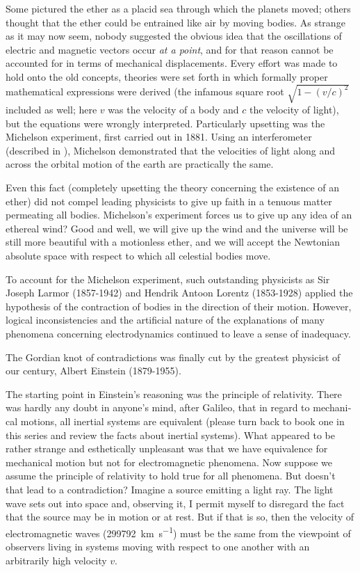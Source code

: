 Some pictured the ether as a placid sea through which the planets moved; others thought that the ether could be entrained like air by moving bodies. As strange as it may now seem, nobody suggested the obvious idea that the oscillations of electric and magnetic vectors occur \emph{at a point}, and for that reason cannot be accounted for in terms of mechanical displacements. Every effort was made to hold onto the old concepts, theories were set forth in which formally proper mathematical expressions
were derived (the infamous square root $\sqrt{ 1- (v/c)^{2}}$ includ­ed as well; here $v$ was the velocity of a body and $c$ the velocity of light), but the equations were wrongly interpreted. Particularly upsetting was the Michelson experi­ment, first carried out in 1881. Using an interferometer (described in ), Michelson demonstrated that the velocities of light along and across the orbital motion of the earth are practically the same.

Even this fact (completely upsetting the theory con­cerning the existence of an ether) did not compel leading physicists to give up faith in a tenuous matter permeating all bodies. Michelson's experiment forces us to give up any idea of an ethereal wind? Good and well, we will give up the wind and the universe will be still more beautiful with a motionless ether, and we will accept the Newtonian absolute space with respect to which all celestial bodies move.

To account for the Michelson experiment, such outstand­ing physicists as Sir Joseph Larmor (1857-1942) and Hendrik Antoon Lorentz (1853-1928) applied the hy­pothesis of the contraction of bodies in the direction of their motion. However, logical inconsistencies and the artificial nature of the explanations of many phenomena concerning electrodynamics continued to leave a sense of inadequacy.

The Gordian knot of contradictions was finally cut by the greatest physicist of our century, Albert Einstein (1879-1955).

The starting point in Einstein's reasoning was the principle of relativity. There was hardly any doubt in anyone's mind, after Galileo, that in regard to mechani­cal motions, all inertial systems are equivalent (please turn back to book one in this series and review the facts about inertial systems). What appeared to be rather strange and esthetically unpleasant was that we have equivalence for mechanical motion but not for electromag­netic phenomena. Now suppose we assume the principle of relativity to hold true for all phenomena. But doesn't that lead to a contradiction? Imagine a source emitting a light ray. The light wave sets out into space and, observing it, I permit myself to disregard the fact that the source may be in motion or at rest. But if that is so, then the velocity of electromagnetic waves (\SI{299 792}{\kilo\meter\per\second}) must be the same from the viewpoint of observers living in systems moving with respect to one another with an arbitrarily high velocity $v$.

